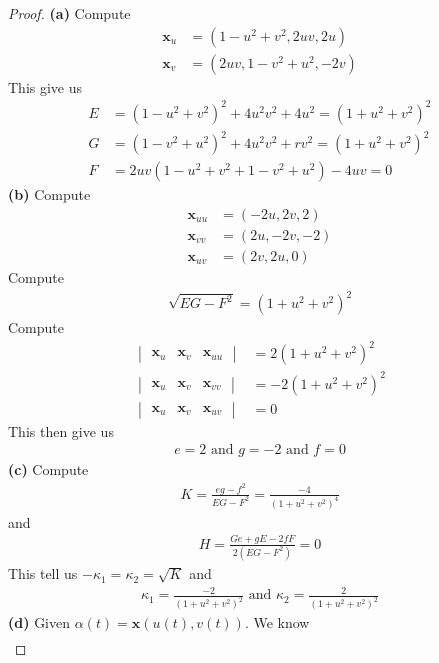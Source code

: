 \documentclass{report}
\begin{document}
\begin{proof}
\textbf{(a)}
Compute 
\begin{align*}
\textbf{x}_u&=(1-u^2+v^2, 2uv, 2u)\\
\textbf{x}_v&=(2uv, 1-v^2+u^2, -2v)
\end{align*}
This give us 
\begin{align*}
E&= (1-u^2+v^2)^2 + 4u^2v^2+4u^2= (1+u^2+v^2)^2\\
G&=(1-v^2+u^2)^2 + 4u^2v^2 + rv^2= (1+u^2+v^2)^2\\
F&=2uv(1-u^2+v^2+1-v^2+u^2)-4uv=0
\end{align*}
\textbf{(b)}
Compute 
\begin{align*}
\textbf{x}_{uu}&=(-2u,2v,2)\\
\textbf{x}_{vv}&=(2u,-2v,-2)\\
\textbf{x}_{uv}&=(2v,2u,0)
\end{align*}
Compute 
\begin{align*}
\sqrt{EG-F^2}=(1+u^2+v^2)^2 
\end{align*}
Compute 
\begin{align*}
\begin{vmatrix} 
  \textbf{x}_u & \textbf{x}_{v} & \textbf{x}_{uu}
\end{vmatrix}&=2(1+u^2+v^2)^2\\
\begin{vmatrix}
  \textbf{x}_u & \textbf{x}_v & \textbf{x}_{vv}
\end{vmatrix}&=-2(1+u^2+v^2)^2\\
\begin{vmatrix}
  \textbf{x}_u & \textbf{x}_v & \textbf{x}_{uv}
\end{vmatrix}&=0
\end{align*}
This then give us 
\begin{align*}
e=2\text{ and }g=-2\text{ and }f=0
\end{align*}
\textbf{(c)}
Compute 
\begin{align*}
K= \frac{eg-f^2}{EG-F^2}= \frac{-4}{(1+u^2+v^2)^4}
\end{align*}
and 
\begin{align*}
H= \frac{Ge+gE-2fF}{2(EG-F^2)}= 0
\end{align*}
This tell us $-\kappa_1 =\kappa_2=\sqrt{K}$ and 
\begin{align*}
\kappa_1 = \frac{-2}{(1+u^2+v^2)^2}\text{ and }\kappa_2=\frac{2}{(1+u^2+v^2)^2}
\end{align*}
\textbf{(d)} Given $\alpha (t)=\textbf{x}(u(t),v(t))$. We know  
\begin{align*}

\end{align*}
\end{proof}
\end{document}
